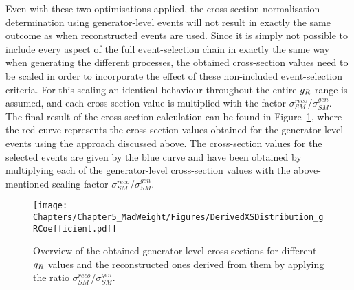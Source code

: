 Even with these two optimisations applied, the cross-section normalisation determination using generator-level events will not result in exactly the same outcome as when reconstructed events are used. Since it is simply not possible to include every aspect of the full event-selection chain in exactly the same way when generating the different processes, the obtained cross-section values need to be scaled in order to incorporate the effect of these non-included event-selection criteria.
For this scaling an identical behaviour throughout the entire $g_{R}$ range is assumed, and each cross-section value is multiplied with the factor $\sigma_{SM}^{reco}$/$\sigma_{SM}^{gen}$. 
\\

The final result of the cross-section calculation can be found in Figure~\ref{fig::XSDistr}, where the red curve represents the cross-section values obtained for the generator-level events using the approach discussed above. The cross-section values for the selected events are given by the blue curve and have been obtained by multiplying each of the generator-level cross-section values with the above-mentioned scaling factor $\sigma_{SM}^{reco}$/$\sigma_{SM}^{gen}$. %
\begin{figure}[h!t]
 \centering
 \texttt{[image: Chapters/Chapter5\_MadWeight/Figures/DerivedXSDistribution\_gRCoefficient.pdf]}
 \caption{Overview of the obtained generator-level cross-sections for different $g_{R}$ values and the reconstructed ones derived from them by applying the ratio $\sigma_{SM}^{reco}$/$\sigma_{SM}^{gen}$.} \label{fig::XSDistr}
\end{figure}

